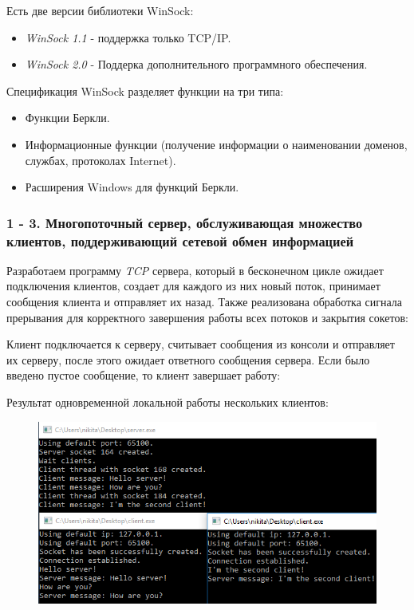 \documentclass[14pt,a4paper,report]{report}
\begin{document}
Есть две версии библиотеки WinSock:

\begin{itemize}
	\item \emph{WinSock 1.1} - поддержка только TCP/IP.
	\item \emph{WinSock 2.0} - Поддерка дополнительного программного обеспечения.
\end{itemize}

Спецификация WinSock разделяет функции на три типа:

\begin{itemize}
	\item Функции Беркли.
	\item Информационные функции (получение информации о наименовании доменов, службах, протоколах Internet).
	\item Расширения Windows для функций Беркли.
\end{itemize}

\subsubsection{1 - 3. Многопоточный сервер, обслуживающая множество клиентов, поддерживающий сетевой обмен информацией}

Разработаем программу \emph{TCP} сервера, который в бесконечном цикле ожидает подключения клиентов, создает для каждого из них новый поток, принимает сообщения клиента и отправляет их назад. Также реализована обработка сигнала прерывания для корректного завершения работы всех потоков и закрытия сокетов:



Клиент подключается к серверу, считывает сообщения из консоли и отправляет их серверу, после этого ожидает ответного сообщения сервера. Если было введено пустое сообщение, то клиент завершает работу:



Результат одновременной локальной работы нескольких клиентов:

\begin{figure}[h!]
	\centering
	\includegraphics[scale = 0.88]{images/p3_1.png}
	
	\caption{}
	\label{image:10}
\end{figure}
\end{document}
